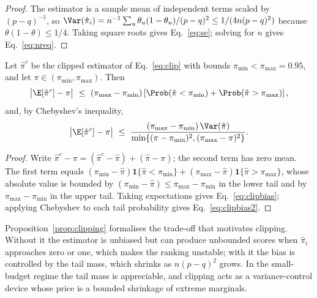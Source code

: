\begin{proof}
The estimator is a sample mean of independent terms scaled by $(p-q)^{-1}$, so $\Var(\hat\pi_i)=n^{-1}\sum_u\theta_u(1-\theta_u)/(p-q)^{2}\le 1/(4n(p-q)^{2})$ because $\theta(1-\theta)\le1/4$. Taking square roots gives Eq.~\eqref{eq:se}; solving for $n$ gives Eq.~\eqref{eq:nreq}.
\end{proof}

\begin{proposition}\label{prop:clipping}
Let $\hat\pi^{c}$ be the clipped estimator of Eq.~\eqref{eq:clip} with bounds $\pi_{\min}<\pi_{\max}=0.95$, and let $\pi\in(\pi_{\min},\pi_{\max})$. Then
\begin{equation}\label{eq:clipbias}
\big|\E[\hat\pi^{c}]-\pi\big|
\ \le\ (\pi_{\max}-\pi_{\min})\left[\Prob(\hat\pi<\pi_{\min})+\Prob(\hat\pi>\pi_{\max})\right],
\end{equation}
and, by Chebyshev's inequality,
\begin{equation}\label{eq:clipbias2}
\big|\E[\hat\pi^{c}]-\pi\big|
\ \le\ \frac{(\pi_{\max}-\pi_{\min})\,\Var(\hat\pi)}
{\min\{(\pi-\pi_{\min})^{2},(\pi_{\max}-\pi)^{2}\}} .
\end{equation}
\end{proposition}

\begin{proof}
Write $\hat\pi^{c}-\pi=(\hat\pi^{c}-\hat\pi)+(\hat\pi-\pi)$; the second term has zero mean. The first term equals $(\pi_{\min}-\hat\pi)\mathbf 1\{\hat\pi<\pi_{\min}\}+(\pi_{\max}-\hat\pi)\mathbf 1\{\hat\pi>\pi_{\max}\}$, whose absolute value is bounded by $(\pi_{\min}-\hat\pi)\le\pi_{\max}-\pi_{\min}$ in the lower tail and by $\pi_{\max}-\pi_{\min}$ in the upper tail. Taking expectations gives Eq.~\eqref{eq:clipbias}; applying Chebyshev to each tail probability gives Eq.~\eqref{eq:clipbias2}.
\end{proof}

\begin{remark}
Proposition~\ref{prop:clipping} formalises the trade-off that motivates clipping. Without it the estimator is unbiased but can produce unbounded scores when $\hat\pi_i$ approaches zero or one, which makes the ranking unstable; with it the bias is controlled by the tail mass, which shrinks as $n(p-q)^{2}$ grows. In the small-budget regime the tail mass is appreciable, and clipping acts as a variance-control device whose price is a bounded shrinkage of extreme marginals.
\end{remark}

